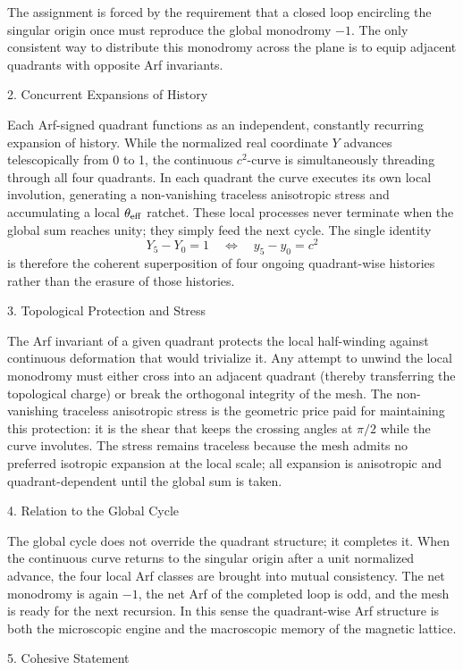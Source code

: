 The assignment is forced by the requirement that a closed loop encircling the singular origin once must reproduce the global monodromy \(-1\). The only consistent way to distribute this monodromy across the plane is to equip adjacent quadrants with opposite Arf invariants.

2. Concurrent Expansions of History

Each Arf-signed quadrant functions as an independent, constantly recurring expansion of history. While the normalized real coordinate \(Y\) advances telescopically from 0 to 1, the continuous \(c^2\)-curve is simultaneously threading through all four quadrants. In each quadrant the curve executes its own local involution, generating a non-vanishing traceless anisotropic stress and accumulating a local \(\theta_{\rm eff}\) ratchet. These local processes never terminate when the global sum reaches unity; they simply feed the next cycle. The single identity  
\[
Y_5 - Y_0 = 1 \quad\Longleftrightarrow\quad y_5 - y_0 = c^2
\]  
is therefore the coherent superposition of four ongoing quadrant-wise histories rather than the erasure of those histories.

3. Topological Protection and Stress

The Arf invariant of a given quadrant protects the local half-winding against continuous deformation that would trivialize it. Any attempt to unwind the local monodromy must either cross into an adjacent quadrant (thereby transferring the topological charge) or break the orthogonal integrity of the mesh. The non-vanishing traceless anisotropic stress is the geometric price paid for maintaining this protection: it is the shear that keeps the crossing angles at \(\pi/2\) while the curve involutes. The stress remains traceless because the mesh admits no preferred isotropic expansion at the local scale; all expansion is anisotropic and quadrant-dependent until the global sum is taken.

4. Relation to the Global Cycle

The global cycle does not override the quadrant structure; it completes it. When the continuous curve returns to the singular origin after a unit normalized advance, the four local Arf classes are brought into mutual consistency. The net monodromy is again \(-1\), the net Arf of the completed loop is odd, and the mesh is ready for the next recursion. In this sense the quadrant-wise Arf structure is both the microscopic engine and the macroscopic memory of the magnetic lattice.

5. Cohesive Statement

